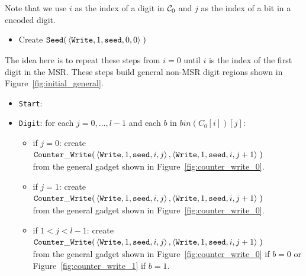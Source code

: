 Note that we use $i$ as the index of a digit in $\mathcal{C}_0$ and $j$ as the index of a bit
in a encoded digit.

\begin{itemize}
    \item Create
    $\begin{aligned}[t]
        {\tt Seed}(&\left\langle {\tt Write}, 1, {\tt seed}, 0, 0 \right\rangle \; )
    \end{aligned}$
\end{itemize}


The idea here is to repeat these steps from $i = 0$ until $i$ is the index of the first digit in the MSR. These
steps build general non-MSR digit regions shown in Figure~\ref{fig:initial_general}.


\begin{itemize}
    \item {\tt Start}:

    \item {\tt Digit}: for each $j=0,\ldots,l-1$ and each $b$ in $bin(C_0[i])[j]$:
    \begin{itemize}
        \item if $j = 0$: create
        $\begin{aligned}[t]
            {\tt Counter\_Write}(&\left\langle {\tt Write}, 1, {\tt seed}, i, j \right\rangle, \left\langle {\tt Write}, 1, {\tt seed}, i, j + 1 \right\rangle \;)
        \end{aligned}$\\from the general gadget shown in Figure~\ref{fig:counter_write_0}.

        \item if $j = 1$: create
        $\begin{aligned}[t]
            {\tt Counter\_Write}(&\left\langle {\tt Write}, 1, {\tt seed}, i, j \right\rangle, \left\langle {\tt Write}, 1, {\tt seed}, i, j + 1 \right\rangle \;)
        \end{aligned}$\\from the general gadget shown in Figure~\ref{fig:counter_write_0}.

        \item if $1 < j < l-1$: create
        $\begin{aligned}[t]
            {\tt Counter\_Write}(&\left\langle {\tt Write}, 1, {\tt seed}, i, j \right\rangle, \left\langle {\tt Write}, 1, {\tt seed}, i, j + 1 \right\rangle \;)
        \end{aligned}$\\from the general gadget shown in Figure~\ref{fig:counter_write_0} if $b = 0$ or Figure~\ref{fig:counter_write_1} if $b = 1$.


\end{itemize}
\end{itemize}
